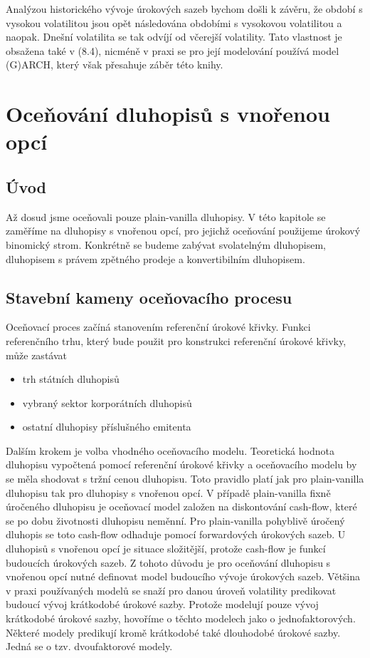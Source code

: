 \documentclass[a4paper]{book}
\begin{document}
Analýzou historického vývoje úrokových sazeb bychom došli k závěru, že období s vysokou volatilitou jsou opět následována obdobími s vysokovou volatilitou a naopak. Dnešní volatilita se tak odvíjí od včerejší volatility. Tato vlastnost je obsažena také v (8.4), nicméně v praxi se pro její modelování používá model (G)ARCH, který však přesahuje záběr této knihy.

\chapter{Oceňování dluhopisů s vnořenou opcí}

\section{Úvod}

Až dosud jsme oceňovali pouze plain-vanilla dluhopisy. V této kapitole se zaměříme na dluhopisy s vnořenou opcí, pro jejichž oceňování použijeme úrokový binomický strom. Konkrétně se budeme zabývat svolatelným dluhopisem, dluhopisem s právem zpětného prodeje a konvertibilním dluhopisem.

\section{Stavební kameny oceňovacího procesu}

Oceňovací proces začíná stanovením referenční úrokové křivky. Funkci referenčního trhu, který bude použit pro konstrukci referenční úrokové křivky, může zastávat
\begin{itemize}
\item trh státních dluhopisů
\item vybraný sektor korporátních dluhopisů
\item ostatní dluhopisy příslušného emitenta
\end{itemize}
Dalším krokem je volba vhodného oceňovacího modelu. Teoretická hodnota dluhopisu vypočtená pomocí referenční úrokové křivky a oceňovacího modelu by se měla shodovat s tržní cenou dluhopisu. Toto pravidlo platí jak pro plain-vanilla dluhopisu tak pro dluhopisy s vnořenou opcí. V případě plain-vanilla fixně úročeného dluhopisu je oceňovací model založen na diskontování cash-flow, které se po dobu životnosti dluhopisu neměnní. Pro plain-vanilla pohyblivě úročený dluhopis se toto cash-flow odhaduje pomocí forwardových úrokových sazeb. U dluhopisů s vnořenou opcí je situace složitější, protože cash-flow je funkcí budoucích úrokových sazeb. Z tohoto důvodu je pro oceňování dluhopisu s vnořenou opcí nutné definovat model budoucího vývoje úrokových sazeb. Většina v praxi používaných modelů se snaží pro danou úroveň volatility predikovat budoucí vývoj krátkodobé úrokové sazby. Protože modelují pouze vývoj krátkodobé úrokové sazby, hovoříme o těchto modelech jako o jednofaktorových. Některé modely predikují kromě krátkodobé také dlouhodobé úrokové sazby. Jedná se o tzv. dvoufaktorové modely.
\end{document}
